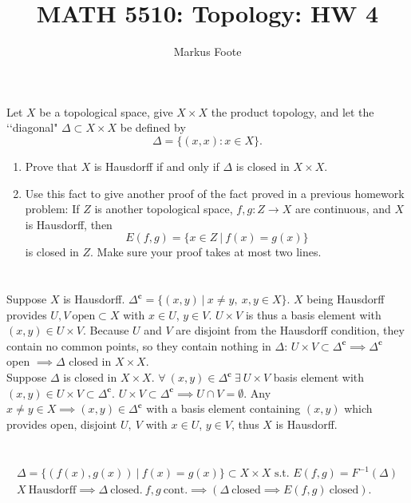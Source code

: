 \documentclass{jhwhw}
\title{MATH 5510: Topology: HW 4}
\author{Markus Foote}
\begin{document}
\problem{}%
Let $X$ be a topological space, give $X\times X$ the product topology, and let the \lq\lq diagonal"  $\Delta\subset X\times X$ be defined by 
$$
\Delta =\{ (x,x): x\in X\}.
$$
\begin{enumerate}
	
	\item Prove that $X$ is Hausdorff if and only if $\Delta$ is closed in $X\times X$.
	
	\item Use this fact to give another proof of the fact proved in a previous homework problem:  If $Z$ is another topological space, $f,g:Z\to X$ are continuous, and $X$ is Hausdorff, then
	$$
	E(f,g) = \{x\in Z \ | \ f(x) = g(x)\}
	$$ 
	is closed in $Z$.  Make sure your proof takes at most two lines.
\end{enumerate}
\solution{}
\part{}
Suppose $X$ is Hausdorff. $\Delta^{\mathbf{c}}=\{(x,y)\ | \ x\ne y,\ x,y\in X\}$. $X$ being Hausdorff provides $U,V\ \mathrm{ open }\subset X$ with $x\in U$, $y\in V$. $U\times V$ is thus a basis element with $(x,y) \in U\times V$. Because $U$ and $V$ are disjoint from the Hausdorff condition, they contain no common points, so they contain nothing in $\Delta$: $U\times V \subset \Delta^{\mathbf{c}}\implies \Delta^{\mathbf{c}}$ open $\implies \Delta$ closed in $X\times X$.
\\

Suppose $\Delta$ is closed in $X\times X$. $\forall\ (x,y)\in \Delta^{\mathbf{c}}\  \exists\ U\times V$ basis element with $(x,y)\in U\times V \subset \Delta^{\mathbf{c}}$. $U\times V \subset \Delta^{\mathbf{c}} \implies U\cap V=\emptyset$. Any $x\ne y\in X \implies (x,y)\in \Delta^{\mathbf{c}}$ with a basis element containing $(x,y)$ which provides open, disjoint $U,\ V$ with $x\in U$, $y\in V$, thus $X$ is Hausdorff.


\part{}
\begin{gather}
\Delta = \{(f(x),g(x))\ | \ f(x) = g(x)\} \subset X \times X \text{ s.t. } E(f,g) = F^{-1}(\Delta) \\
X \ \text{Hausdorff}\implies \Delta \ \text{closed.} \ f,g \ \text{cont.} \implies \left( \Delta\ \text{closed} \implies E(f,g)\ \text{closed} \right).
\end{gather}
\\
\end{document}
